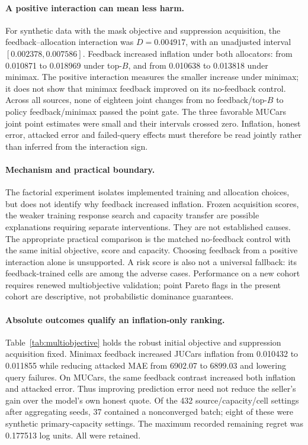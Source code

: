 \documentclass[11pt]{article}
\begin{document}
\paragraph{A positive interaction can mean less harm.}
For synthetic data with the mask objective and suppression acquisition, the
feedback--allocation interaction was $D=0.004917$, with an unadjusted interval
$[0.002378,0.007586]$. Feedback increased inflation under both allocators:
from 0.010871 to 0.018969 under top-$B$, and from 0.010638 to 0.013818 under
minimax. The positive interaction measures the smaller increase under minimax;
it does not show that minimax feedback improved on its no-feedback control.
Across all sources, none of eighteen joint changes from no feedback/top-$B$
to policy feedback/minimax passed the point gate. The three favorable MUCars
joint point estimates were small and their intervals crossed zero. Inflation,
honest error, attacked error and failed-query effects must therefore be read
jointly rather than inferred from the interaction sign.

\paragraph{Mechanism and practical boundary.}
The factorial experiment isolates implemented training and allocation choices,
but does not identify why feedback increased inflation. Frozen acquisition
scores, the weaker training response search and capacity transfer are possible
explanations requiring separate interventions. They are not established causes.
The appropriate practical comparison is the matched no-feedback control with
the same initial objective, score and capacity. Choosing feedback from a
positive interaction alone is unsupported. A risk score is also not a universal
fallback: its feedback-trained cells are among the adverse cases. Performance
on a new cohort requires renewed multiobjective validation; point Pareto flags
in the present cohort are descriptive, not probabilistic dominance guarantees.


\paragraph{Absolute outcomes qualify an inflation-only ranking.}
Table~\ref{tab:multiobjective} holds the robust initial objective and suppression
acquisition fixed. Minimax feedback increased JUCars inflation from 0.010432
to 0.011855 while reducing attacked MAE from 6902.07 to 6899.03 and lowering
query failures. On MUCars, the same feedback contrast increased both inflation
and attacked error. Thus improving prediction error need not reduce the
seller's gain over the model's own honest quote. Of the 432 source/capacity/cell
settings after aggregating seeds, 37 contained a nonconverged batch; eight of
these were synthetic primary-capacity settings. The maximum recorded remaining
regret was 0.177513 log units. All were retained.
\end{document}
